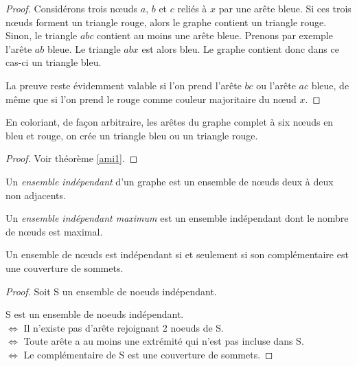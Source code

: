 \begin{mytheo} 
\begin{proof}
     Considérons trois nœuds $a$, $b$ et $c$ reliés à $x$ par une arête bleue. Si ces trois nœuds forment un triangle rouge, alors le graphe contient un triangle rouge. Sinon, le triangle $abc$ contient au moins une arête bleue. Prenons par exemple l'arête $ab$ bleue. Le triangle $abx$ est alors bleu. Le graphe contient donc dans ce cas-ci un triangle bleu. 
     
     La preuve reste évidemment valable si l'on prend l'arête $bc$ ou l'arête $ac$ bleue, de même que si l'on prend le rouge comme couleur majoritaire du nœud $x$.
  \end{proof}
\end{mytheo}

\begin{mytheo}  \label{ami2}
  En coloriant, de façon arbitraire, les arêtes du graphe complet à six nœuds en bleu et rouge, on crée un triangle bleu ou un triangle rouge.
  \begin{proof}
  	Voir théorème \ref{ami1}.
  \end{proof}
\end{mytheo}

\begin{mydef}
  Un \emph{ensemble indépendant} d'un graphe est un ensemble de nœuds deux à deux non adjacents.
\end{mydef}

\begin{mydef}
  Un \emph{ensemble indépendant maximum} est un ensemble indépendant dont le nombre de nœuds est maximal.
\end{mydef}

\begin{mytheo}
Un ensemble de nœuds est indépendant si et seulement si son complémentaire est une couverture de sommets.
\begin{proof}
Soit S un ensemble de noeuds indépendant.
 
S est un ensemble de noeuds indépendant. \\
$\Leftrightarrow$ Il n'existe pas d'arête rejoignant 2 noeuds de S. \\
$\Leftrightarrow$ Toute arête a au moins une extrémité qui n'est pas incluse dans S. \\
$\Leftrightarrow$ Le complémentaire de S est une couverture de sommets.
\end{proof}
\end{mytheo}

